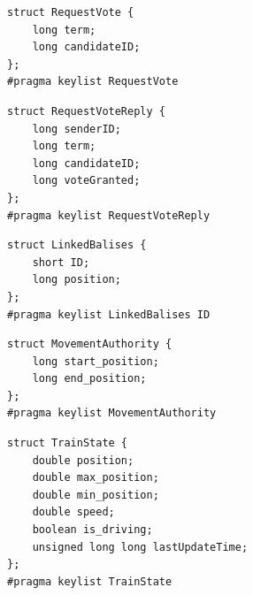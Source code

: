 \begin{lstlisting}[caption={\abr{IDL} definition for the \texttt{RequestVote} topic. The \texttt{term} variable represents the candidate's term, while \texttt{candidateID} encodes the candidate that requested the vote.}, label=code:requestVote]
struct RequestVote {
    long term;
    long candidateID;
};
#pragma keylist RequestVote
\end{lstlisting}

\begin{lstlisting}[caption={\abr{IDL} definition for the \texttt{RequestVoteReply} topic. The \texttt{term} encodes the sender's term for the candidate to update itself. \texttt{voteGranted} shows whether the replica granted the vote request for the given term. The \texttt{candidateID} and \texttt{senderID} are used to identify which replica granted the vote for which replica respectively.}, label=code:requestVoteReply]
struct RequestVoteReply {
    long senderID;
    long term;
    long candidateID;
    long voteGranted;
};
#pragma keylist RequestVoteReply
\end{lstlisting}



\begin{lstlisting}[caption={\abr{IDL} definition for the \texttt{LinkedBalises} topic. Each linked balise has an unique identifier and a position that is communicated to the system by the \abr{RBC}.}, label=code:linkedBalises]
struct LinkedBalises {
    short ID;
    long position;
};
#pragma keylist LinkedBalises ID
\end{lstlisting}

\begin{lstlisting}[caption={\abr{IDL} definition for the \texttt{MovementAuthority} topic. The \texttt{start\_position} encodes where the \abr{MA} starts and the \texttt{end\_position} encodes until where it is valid.}, label=code:movementAuthority]
struct MovementAuthority {
    long start_position;
    long end_position;
};
#pragma keylist MovementAuthority
\end{lstlisting}

\begin{lstlisting}[caption={\abr{IDL} definition for the \texttt{TrainState} topic. The train's state consists of a current position and a current speed. Due to inaccuracies of the position sensors, a train's position cannot be determined exactly. Therefore, a confidence interval is maintained that defines an area where the train certainly is. This area is bounded by \texttt{max\_position} and \texttt{min\_position}. With \texttt{is\_driving} it is encoded whether the virtual train drives or stands still. The \texttt{lastUpdateTime} variable is used to simulate the train's position based on its speed.}, label=code:trainState]
struct TrainState {
    double position;
    double max_position;
    double min_position;
    double speed;
    boolean is_driving;
    unsigned long long lastUpdateTime;
};
#pragma keylist TrainState
\end{lstlisting}

